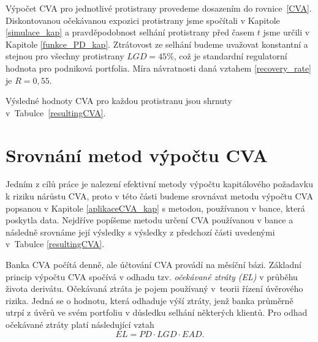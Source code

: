 \documentclass[a4paper,12pt]{report}
\theoremstyle{definition} \newtheorem{definice}[veta]{Definice}
\theoremstyle{remark}
\begin{document}
Výpočet CVA pro jednotlivé protistrany provedeme dosazením do rovnice~\eqref{CVA}. 
Diskontovanou očekávanou expozici protistrany jsme spočítali v Kapitole \ref{simulace_kap} a pravděpodobnost selhání protistrany před časem $t$ jsme určili v Kapitole \ref{funkce_PD_kap}.
Ztrátovost ze selhání budeme uvažovat konstantní a stejnou pro všechny protistrany $LGD=45\%$, což je standardní regulatorní hodnota pro podniková portfolia. 
Míra návratnosti daná vztahem \eqref{recovery_rate} je $R=0,55$.

Výsledné hodnoty CVA pro každou protistranu jsou shrnuty v~Tabulce~\ref{resultingCVA}.
\begin{table}[!htbp]
  \centering 
\caption{Přehled výsledků CVA pro jednotlivé protistrany}
\label{resultingCVA}
\vspace{5mm}
\end{table}



\section{Srovnání metod výpočtu CVA}\label{srovnani_metod_cva}
Jedním z cílů práce je nalezení efektivní metody výpočtu kapitálového požadavku k riziku nárůstu CVA, proto v této části budeme srovnávat metodu výpočtu CVA popsanou v Kapitole \ref{aplikaceCVA_kap} s metodou, používanou v bance, která poskytla data.
Nejdříve popíšeme metodu určení CVA používanou v bance a následně srovnáme její výsledky s výsledky z předchozí části uvedenými v~Tabulce \ref{resultingCVA}. 

Banka CVA počítá denně, ale účtování CVA provádí na měsíční bázi.
Základní princip výpočtu CVA spočívá v odhadu tzv. \textit{očekávané ztráty (EL)} v průběhu života derivátu. 
Očekávaná ztráta je pojem používaný v~teorii řízení úvěrového rizika.
Jedná se o hodnotu, která odhaduje výší ztráty, jenž banka průměrně utrpí z úvěrů ve svém portfoliu v důsledku selhání některých klientů. 
Pro odhad očekávané ztráty platí následující vztah 
\begin{equation}\label{el}
EL=PD\cdot LGD\cdot EAD.
\end{equation}
\end{document}
